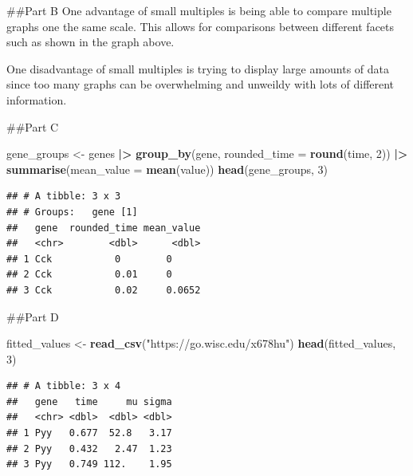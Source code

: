 \documentclass[
]{article}
\newenvironment{Shaded}{\begin{snugshade}}{\end{snugshade}}
\newcommand{\AttributeTok}[1]{\textcolor[rgb]{0.13,0.29,0.53}{#1}}
\newcommand{\DecValTok}[1]{\textcolor[rgb]{0.00,0.00,0.81}{#1}}
\newcommand{\FunctionTok}[1]{\textcolor[rgb]{0.13,0.29,0.53}{\textbf{#1}}}
\newcommand{\NormalTok}[1]{#1}
\newcommand{\OtherTok}[1]{\textcolor[rgb]{0.56,0.35,0.01}{#1}}
\newcommand{\SpecialCharTok}[1]{\textcolor[rgb]{0.81,0.36,0.00}{\textbf{#1}}}
\newcommand{\StringTok}[1]{\textcolor[rgb]{0.31,0.60,0.02}{#1}}
\begin{document}
\#\#Part B One advantage of small multiples is being able to compare
multiple graphs one the same scale. This allows for comparisons between
different facets such as shown in the graph above.

One disadvantage of small multiples is trying to display large amounts
of data since too many graphs can be overwhelming and unweildy with lots
of different information.

\#\#Part C

\begin{Shaded}
\begin{Highlighting}[]
\NormalTok{gene\_groups }\OtherTok{\textless{}{-}}\NormalTok{ genes }\SpecialCharTok{|\textgreater{}}
\FunctionTok{group\_by}\NormalTok{(gene, }\AttributeTok{rounded\_time =} \FunctionTok{round}\NormalTok{(time, }\DecValTok{2}\NormalTok{)) }\SpecialCharTok{|\textgreater{}}
\FunctionTok{summarise}\NormalTok{(}\AttributeTok{mean\_value =} \FunctionTok{mean}\NormalTok{(value))}
\FunctionTok{head}\NormalTok{(gene\_groups, }\DecValTok{3}\NormalTok{)}
\end{Highlighting}
\end{Shaded}

\begin{verbatim}
## # A tibble: 3 x 3
## # Groups:   gene [1]
##   gene  rounded_time mean_value
##   <chr>        <dbl>      <dbl>
## 1 Cck           0        0     
## 2 Cck           0.01     0     
## 3 Cck           0.02     0.0652
\end{verbatim}

\#\#Part D

\begin{Shaded}
\begin{Highlighting}[]
\NormalTok{fitted\_values }\OtherTok{\textless{}{-}} \FunctionTok{read\_csv}\NormalTok{(}\StringTok{"https://go.wisc.edu/x678hu"}\NormalTok{)}
\FunctionTok{head}\NormalTok{(fitted\_values, }\DecValTok{3}\NormalTok{)}
\end{Highlighting}
\end{Shaded}

\begin{verbatim}
## # A tibble: 3 x 4
##   gene   time     mu sigma
##   <chr> <dbl>  <dbl> <dbl>
## 1 Pyy   0.677  52.8   3.17
## 2 Pyy   0.432   2.47  1.23
## 3 Pyy   0.749 112.    1.95
\end{verbatim}
\end{document}
